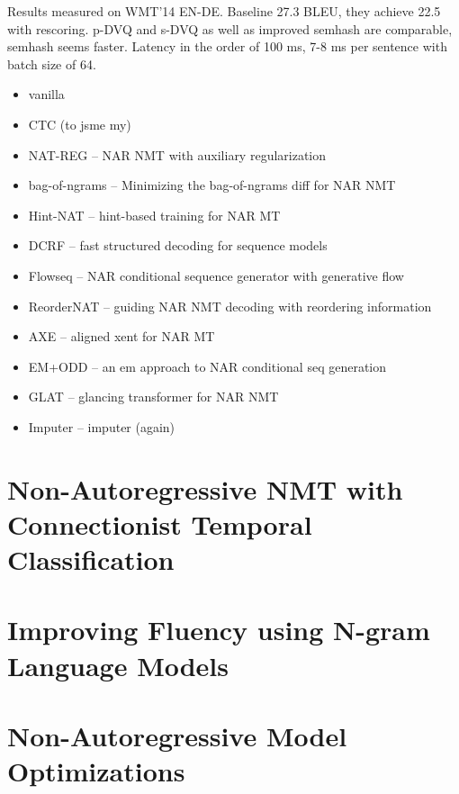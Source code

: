 Results measured on WMT'14 EN-DE. Baseline 27.3 BLEU, they achieve 22.5 with
rescoring. p-DVQ and s-DVQ as well as improved semhash are comparable, semhash
seems faster. Latency in the order of 100 ms, 7-8 ms per sentence with batch
size of 64.





\begin{itemize}
\item vanilla \citep{gu2017nonautoregressive} 
\item CTC (to jsme my)
\item NAT-REG \citep{wang2019nonautoregressive} -- NAR NMT with auxiliary regularization
\item bag-of-ngrams \citep{shao2020minimizing} -- Minimizing the bag-of-ngrams diff for NAR NMT
\item Hint-NAT \citep{li2019hint} -- hint-based training for NAR MT
\item DCRF \citep{sun2019fast} -- fast structured decoding for sequence models
\item Flowseq \citep{ma2019flowseq} -- NAR conditional sequence generator with generative flow
\item ReorderNAT \citep{ran2019guiding} -- guiding NAR NMT decoding with reordering information
\item AXE \citep{ghazvininejad2020aligned} -- aligned xent for NAR MT
\item EM+ODD \citep{sun2020em} -- an em approach to NAR conditional seq generation
\item GLAT \citep{qian2020glancing} -- glancing transformer for NAR NMT
\item Imputer \citep{saharia2020nonautoregressive} -- imputer (again)
\end{itemize}

\section{Non-Autoregressive NMT with Connectionist Temporal Classification}
\label{sec:nat-ctc}



\section{Improving Fluency using N-gram Language Models}
\label{sec:nat-lm}


\section{Non-Autoregressive Model Optimizations}
\label{sec:nat-opt}



